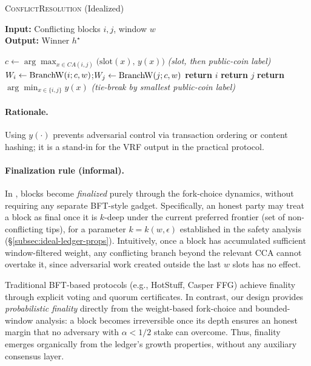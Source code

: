 \begin{algorithm}[H]
\caption{\textsc{ConflictResolution} (Idealized)}\label{alg:cca-ideal}
\label{alg:ideal-cca}

\textbf{Input:} Conflicting blocks $i,j$, window $w$\\
\textbf{Output:} Winner $h^\star$
\begin{algorithmic}[1]
\State $c \leftarrow \arg\max_{x\in CA(i,j)} \big(\mathrm{slot}(x),\, y(x)\big)$ \hfill \textit{(slot, then public-coin label)} 
\State $W_i \leftarrow \mathrm{BranchW}(i; c, w)$;\quad $W_j \leftarrow \mathrm{BranchW}(j; c, w)$
 \State \textbf{return} $i$
 \State \textbf{return} $j$
\Else \State \textbf{return} $\arg\min_{x\in\{i,j\}} y(x)$ \hfill \textit{(tie-break by smallest public-coin label)} 
\EndIf
\end{algorithmic}
\end{algorithm}

\paragraph{Rationale.} 
Using $y(\cdot)$ prevents adversarial control via transaction ordering or content hashing; it is a stand-in for the VRF output in the practical protocol.




\paragraph{Finalization rule (informal).}
In \ProjIdeal, blocks become \emph{finalized} purely through the fork-choice dynamics,
without requiring any separate BFT-style gadget.
Specifically, an honest party may treat a block as final once it is
$k$-deep under the current 
preferred frontier (set of non-conflicting tips), 
for a parameter
$k=k(w,\epsilon)$ established in the safety analysis
(\S\ref{subsec:ideal-ledger-props}).
Intuitively, once a block has accumulated sufficient window-filtered weight,
any conflicting branch beyond the relevant CCA cannot overtake it,
since adversarial work created outside the last $w$ slots has no effect.

\begin{remark}
Traditional BFT-based protocols (e.g., HotStuff, Casper FFG) achieve finality
through explicit voting and quorum certificates.
In contrast, our design provides \emph{probabilistic finality} directly from
the weight-based fork-choice and bounded-window analysis:
a block becomes irreversible once its depth ensures an honest margin
that no adversary with $\alpha < 1/2$ stake can overcome.
Thus, finality emerges organically from the ledger’s growth properties,
without any auxiliary consensus layer.
\end{remark}







